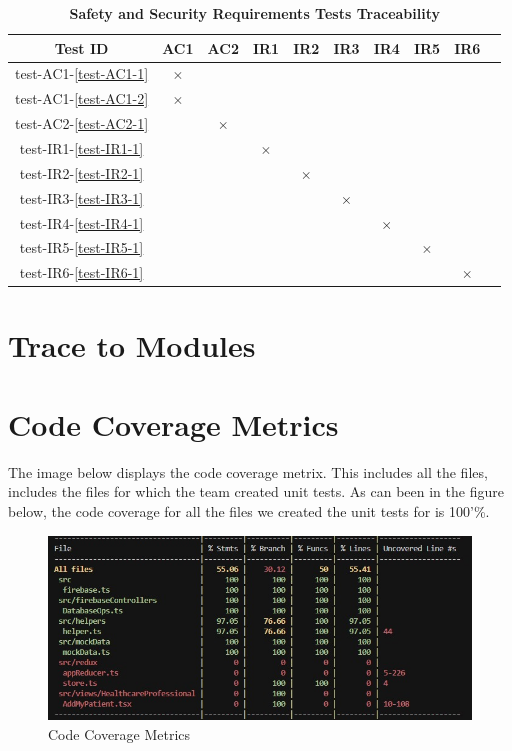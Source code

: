\documentclass[12pt, titlepage]{article}
\begin{document}
\begin{table} [H]
  \centering
  \begin{tabular}{|c|c|c|c|c|c|c|c|c|c|}
  \hline
  Test ID & AC1 & AC2 & IR1 & IR2 & IR3 & IR4 & IR5 & IR6 \\
  \hline
  test-AC1-\ref{test-AC1-1} & $\times$ & & & & & & &   \\
  \hline
  test-AC1-\ref{test-AC1-2} & $\times$ & & & & & & &   \\
  \hline
  test-AC2-\ref{test-AC2-1} & & $\times$ & & & & & &   \\
  \hline
  test-IR1-\ref{test-IR1-1} & & & $\times$ & & & & &   \\
  \hline
  test-IR2-\ref{test-IR2-1}  & & & & $\times$ & & & &  \\
  \hline
  test-IR3-\ref{test-IR3-1}  & & & & & $\times$ & & &  \\
  \hline
  test-IR4-\ref{test-IR4-1}  & & & & & & $\times$ & &  \\
  \hline
  test-IR5-\ref{test-IR5-1}  & & & & & & &  $\times$ & \\
  \hline
  test-IR6-\ref{test-IR6-1}  & & & & & & & &  $\times$ \\
  \hline
\end{tabular}
\caption{\bf Safety and Security Requirements Tests Traceability} \label{tab:sns-test-traceability}
\end{table}
		
\section{Trace to Modules}		

\section{Code Coverage Metrics}

The image below displays the code coverage metrix. This includes all the files, includes the files for which the team created unit tests. As can been in the figure below, the code coverage for all the files we created the unit tests for is 100'\%.

\begin{figure}[h]
  \centering
  \includegraphics[width=1\textwidth]{code_coverage_metrics.jpg}
  \caption{Code Coverage Metrics}
\end{figure}
\end{document}

